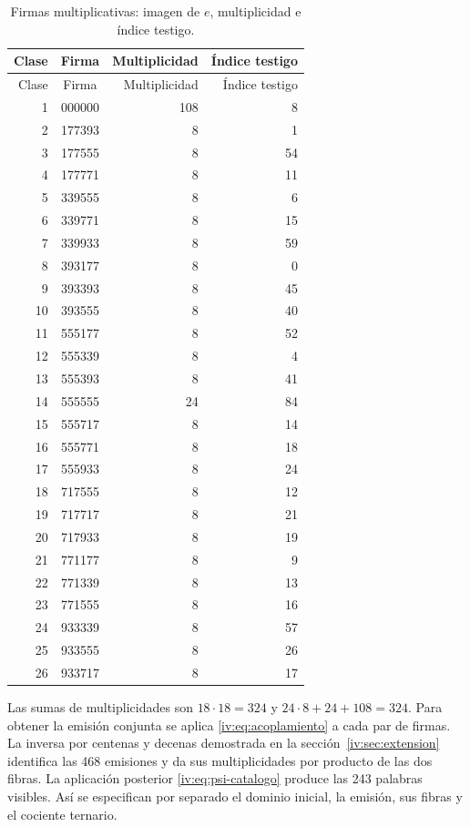 \begin{longtable}{rcrr}
\caption{Firmas multiplicativas: imagen de \(e\), multiplicidad e índice testigo.}
\label{iv:iv:tabla-firmas-multiplicativas}\\
\toprule
Clase & Firma & Multiplicidad & Índice testigo\\
\midrule
\endfirsthead
\toprule
Clase & Firma & Multiplicidad & Índice testigo\\
\midrule
\endhead
1&000000&108&8\\
2&177393&8&1\\
3&177555&8&54\\
4&177771&8&11\\
5&339555&8&6\\
6&339771&8&15\\
7&339933&8&59\\
8&393177&8&0\\
9&393393&8&45\\
10&393555&8&40\\
11&555177&8&52\\
12&555339&8&4\\
13&555393&8&41\\
14&555555&24&84\\
15&555717&8&14\\
16&555771&8&18\\
17&555933&8&24\\
18&717555&8&12\\
19&717717&8&21\\
20&717933&8&19\\
21&771177&8&9\\
22&771339&8&13\\
23&771555&8&16\\
24&933339&8&57\\
25&933555&8&26\\
26&933717&8&17\\
\bottomrule
\end{longtable}

Las sumas de multiplicidades son \(18\cdot18=324\) y
\(24\cdot8+24+108=324\). Para obtener la emisión conjunta se aplica
\eqref{iv:eq:acoplamiento} a cada par de firmas. La inversa por centenas
y decenas demostrada en la sección~\ref{iv:sec:extension} identifica las 468
emisiones y da sus multiplicidades por producto de las dos fibras.
La aplicación posterior \eqref{iv:eq:psi-catalogo} produce las 243
palabras visibles. Así se especifican por separado el dominio inicial,
la emisión, sus fibras y el cociente ternario.

